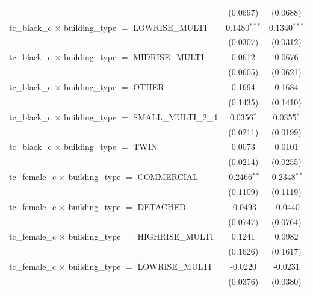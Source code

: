 \begin{tabular}{lcc}
                                                                       & (0.0697)       & (0.0688)\\   
   tc\_black\_c $\times$ building\_type $=$ LOWRISE\_MULTI             & 0.1480$^{***}$ & 0.1340$^{***}$\\   
                                                                       & (0.0307)       & (0.0312)\\   
   tc\_black\_c $\times$ building\_type $=$ MIDRISE\_MULTI             & 0.0612         & 0.0676\\   
                                                                       & (0.0605)       & (0.0621)\\   
   tc\_black\_c $\times$ building\_type $=$ OTHER                      & 0.1694         & 0.1684\\   
                                                                       & (0.1435)       & (0.1410)\\   
   tc\_black\_c $\times$ building\_type $=$ SMALL\_MULTI\_2\_4         & 0.0356$^{*}$   & 0.0355$^{*}$\\   
                                                                       & (0.0211)       & (0.0199)\\   
   tc\_black\_c $\times$ building\_type $=$ TWIN                       & 0.0073         & 0.0101\\   
                                                                       & (0.0214)       & (0.0255)\\   
   tc\_female\_c $\times$ building\_type $=$ COMMERCIAL                & -0.2466$^{**}$ & -0.2348$^{**}$\\   
                                                                       & (0.1109)       & (0.1119)\\   
   tc\_female\_c $\times$ building\_type $=$ DETACHED                  & -0.0493        & -0.0440\\   
                                                                       & (0.0747)       & (0.0764)\\   
   tc\_female\_c $\times$ building\_type $=$ HIGHRISE\_MULTI           & 0.1241         & 0.0982\\   
                                                                       & (0.1626)       & (0.1617)\\   
   tc\_female\_c $\times$ building\_type $=$ LOWRISE\_MULTI            & -0.0220        & -0.0231\\   
                                                                       & (0.0376)       & (0.0380)\\   

\end{tabular}
